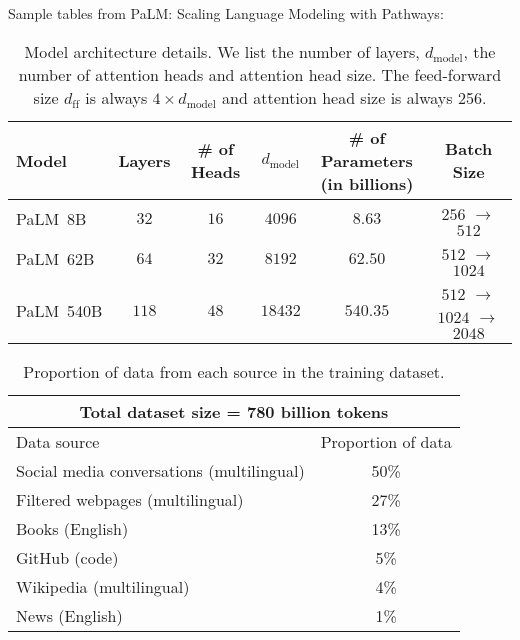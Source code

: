 \documentclass{article}
\newcommand{\ournameshort}[0]{PaLM\xspace}
\begin{document}
Sample tables from PaLM: Scaling Language Modeling with Pathways:


\begin{table}[h!]
\begin{center}
\begin{tabular}{ lccccc } 
\toprule
Model & Layers   & \# of Heads   &  $d_\textrm{model}$ &  \makecell[c]{\# of Parameters \\(in billions)} & Batch Size  \\ 
\midrule
\ournameshort{}~8B & $32$ & $16$  & $4096$ & $8.63$ & $256$ $\rightarrow$ $512$ \\
\ournameshort{}~62B & $64$ & $32$  & $8192$ & $62.50$ & $512$ $\rightarrow$ $1024$ \\
\ournameshort{}~540B & $118$ & $48$ & $18432$ & $540.35$ & $512$ $\rightarrow$ $1024$ $\rightarrow$ $2048$ \\
\bottomrule
\end{tabular}
\end{center}
\caption{Model architecture details. We list the number of layers, $d_\textrm{model}$, the number of attention heads and attention head size. The feed-forward size $d_\textrm{ff}$ is always $4 \times d_\textrm{model}$ and attention head size is always 256.}
\label{table:model-hyperparams}
\end{table}


\begin{table}[h!]
\begin{center}
\begin{tabular}{ lc } 
\toprule
  \multicolumn{2}{c}{Total dataset size = 780 billion tokens}      \\ 
\midrule
  Data source & Proportion of data     \\ 
\midrule
 Social media conversations (multilingual) & 50\% \\
 Filtered webpages (multilingual)     & 27\%         \\ 
 Books (English) & 13\%   \\ 
 GitHub (code) & 5\% \\
 Wikipedia (multilingual) & 4\%  \\ 
 News (English) & 1\% \\
\bottomrule
\end{tabular}
\end{center}
\caption{Proportion of data from each source in the training dataset.}
\label{table:dataset-mix}
\end{table}
\end{document}
